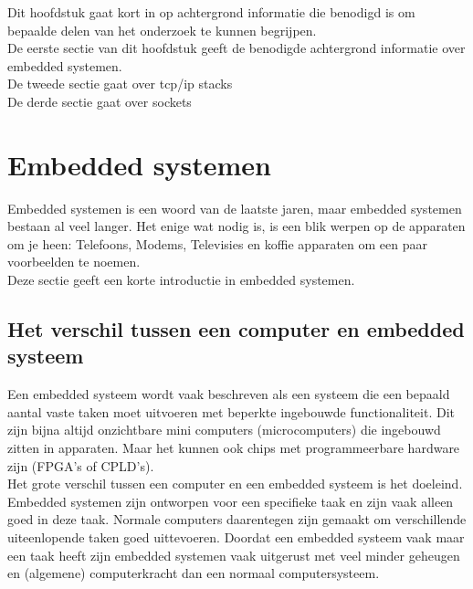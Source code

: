 \documentclass[../DCM2_Verslag.tex]{subfiles}
\begin{document}
Dit hoofdstuk gaat kort in op achtergrond informatie die benodigd is om bepaalde delen van het onderzoek te kunnen begrijpen.
\\
De eerste sectie van dit hoofdstuk geeft de benodigde achtergrond informatie over embedded systemen.
\\
De tweede sectie gaat over tcp/ip stacks
\\
De derde sectie gaat over sockets

\section{Embedded systemen}
Embedded systemen is een woord van de laatste jaren, maar embedded systemen bestaan al veel langer. Het enige wat nodig is, is een blik werpen op de apparaten om je heen: Telefoons, Modems, Televisies en koffie apparaten om een paar voorbeelden te noemen. 
\\
Deze sectie geeft een korte introductie in embedded systemen.

\subsection{Het verschil tussen een computer en embedded systeem}
Een embedded systeem wordt vaak beschreven als een systeem die een bepaald aantal vaste taken moet uitvoeren met beperkte ingebouwde functionaliteit. Dit zijn bijna altijd onzichtbare mini computers (microcomputers) die ingebouwd zitten in apparaten. Maar het kunnen ook chips met programmeerbare hardware zijn (FPGA's of CPLD's). 
\\
Het grote verschil tussen een computer en een embedded systeem is het doeleind. Embedded systemen zijn ontworpen voor een specifieke taak en zijn vaak alleen goed in deze taak. Normale computers daarentegen zijn gemaakt om verschillende uiteenlopende taken goed uittevoeren. Doordat een embedded systeem vaak maar een taak heeft zijn embedded systemen vaak uitgerust met veel minder geheugen en (algemene) computerkracht dan een normaal computersysteem.
\end{document}
